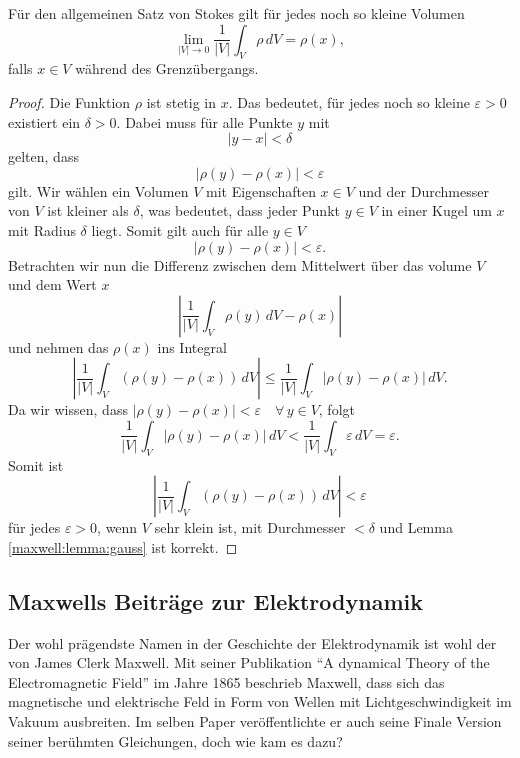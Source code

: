 \begin{lemma}
	\label{maxwell:lemma:gauss}
	Für den allgemeinen Satz von Stokes gilt für jedes noch so kleine Volumen
	\[
	\lim_{\left| V \right| \to 0} \frac{1}{\left| V \right|} \int_{V} \rho \, dV = \rho(x),
	\]
	falls $x\in V$ während des Grenzübergangs.
\end{lemma}
\begin{proof}
	Die Funktion $\rho$ ist stetig in $x$. Das bedeutet, für jedes noch so kleine $\varepsilon > 0$ existiert ein $\delta > 0$.
	Dabei muss für alle Punkte $y$ mit
	\[
	\left|y-x\right| < \delta	
	\]
	gelten, dass 
	\[
	\left|\rho(y) - \rho(x)\right| < \varepsilon
	\] 
	gilt.
	Wir wählen ein Volumen $V$ mit Eigenschaften $x \in V$ und der Durchmesser von $V$ ist kleiner als $\delta$, was bedeutet, dass jeder Punkt $y \in V$ in einer Kugel um $x$ mit Radius $\delta$ liegt.
	Somit gilt auch für alle $y \in V$
	\[
	\left|\rho(y) - \rho(x)\right| < \varepsilon .
	\]
	Betrachten wir nun die Differenz zwischen dem Mittelwert über das volume $V$ und dem Wert $x$
	\[
	\left|
	\frac{1}{\left|V\right|}
	\int_{V}
	\rho(y)
	\,
	dV
	-
	\rho(x)
	\right|
	\]
	und nehmen das $\rho(x)$ ins Integral
	\[
	\left|
	\frac{1}{\left|V\right|}
	\int_{V}
	(\rho(y) - \rho(x)) \, dV
	\right|
	\leq
	\frac{1}{\left|V\right|}
	\int_{V}
	\left|
	\rho(y) - \rho(x)
	\right|
	\,
	dV .
	\]
	Da wir wissen, dass $\left|\rho(y) - \rho(x)\right| < \varepsilon \quad \forall \, y \in V$, folgt
	\[
	\frac{1}{\left|V\right|}
	\int_{V}
	\left|
	\rho(y) - \rho(x)
	\right|
	\,
	dV
	<
	\frac{1}{\left|V\right|}
	\int_{V}
	\varepsilon
	\,
	dV
	=
	\varepsilon .
	\]
	Somit ist 
	\[
	\left|
	\frac{1}{\left|V\right|}
	\int_{V}
	(\rho(y) - \rho(x)) \, dV
	\right|
	<
	\varepsilon
	\]
	für jedes $\varepsilon > 0$, wenn $V$ sehr klein ist, mit Durchmesser $< \delta$ und Lemma \ref{maxwell:lemma:gauss} ist korrekt.
\end{proof}


\subsection{Maxwells Beiträge zur Elektrodynamik}
Der wohl prägendste Namen in der Geschichte der Elektrodynamik ist wohl der von James Clerk Maxwell.
Mit seiner Publikation ``A dynamical Theory of the Electromagnetic Field'' im Jahre 1865 beschrieb Maxwell, dass sich das magnetische und elektrische Feld in Form von Wellen mit Lichtgeschwindigkeit im Vakuum ausbreiten.
Im selben Paper veröffentlichte er auch seine Finale Version seiner berühmten Gleichungen, doch wie kam es dazu?

